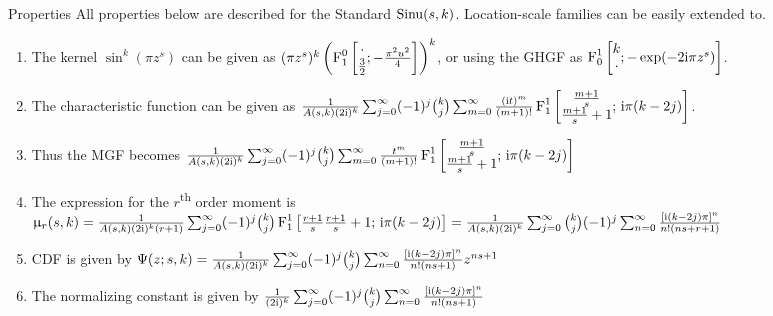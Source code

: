 \documentclass{beamer}
\begin{document}
\begin{frame}[allowframebreaks]{Properties}
All properties below are described for the Standard \sindist{} $\operatorname*{Sinu}(s,k)$. Location-scale families can be easily extended to.
	\begin{enumerate}
		\item The kernel $\sin^k (\pi z^s)$ can be given as
		$(\pi z^s)^k \left( \operatorname{F}^0_1 \left[ \begin{matrix} \cdot \\ \frac{3}{2} \end{matrix}; -\frac{\pi^2 u^2}{4}\right] \right)^k$, or using the GHGF as $\operatorname{F}^1_0 \left[ \begin{matrix}k\\ \cdot\end{matrix};  -\exp(-2 \mathrm i \pi z^s) \right]$.
		\item The characteristic function can be given as $\frac{1}{A(s,k) (2\mathrm i)^k} \sum_{j=0}^{\infty} (-1)^j \binom{k}{j} \sum_{m=0}^{\infty} \frac{(\mathrm i t)^m}{(m+1)!} \operatorname{F}^1_1\left[ \begin{matrix}\frac{m+1}{s}\\ \frac{m+1}{s} + 1 \end{matrix};\, \mathrm i\pi(k-2j) \right]$.
		\item Thus the MGF becomes $\frac{1}{A(s,k) (2\mathrm i)^k} \sum_{j=0}^{\infty} (-1)^j \binom{k}{j} \sum_{m=0}^{\infty} \frac{t^m}{(m+1)!} \operatorname{F}^1_1\left[ \begin{matrix}\frac{m+1}{s}\\ \frac{m+1}{s} + 1 \end{matrix};\, \mathrm i\pi(k-2j) \right]$
		\item The expression for the $r$\textsuperscript{th} order moment is $\upmu_r(s,k) = \frac{1}{A(s,k) (2\mathrm i)^k (r+1)} \sum_{j=0}^{\infty} (-1)^j \binom{k}{j} \operatorname{F}^1_1 \left[ \begin{matrix}\frac{r+1}{s} \frac{r+1}{s} + 1\end{matrix}; \, \mathrm i\pi(k-2j) \right]
		= \frac{1}{A(s,k) (2\mathrm i)^k} \sum_{j=0}^\infty {k \choose j} (-1)^j \sum_{n=0}^{\infty} \frac{[\mathrm i (k-2j) \pi]^n}{n! (ns+r+1)}$
		\item CDF is given by $ \Psi(z; s,k) = \frac{1}{A(s,k) (2\mathrm i)^k} \sum_{j=0}^\infty (-1)^j {k \choose j} \sum_{n=0}^{\infty} \frac{[\mathrm i (k-2j) \pi]^n}{n! (ns+1)} z^{ns+1}$
		\item The normalizing constant is given by $\frac{1}{(2\mathrm i)^k} \sum_{j=0}^\infty (-1)^j {k \choose j} \sum_{n=0}^{\infty} \frac{[\mathrm i (k-2j) \pi]^n}{n! (ns+1)}$
	\end{enumerate}
\end{frame}
\end{document}
